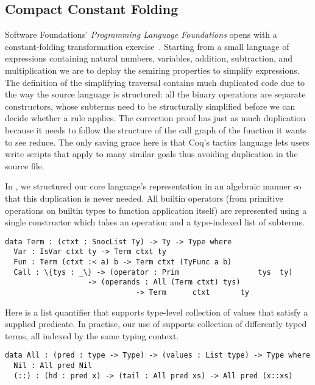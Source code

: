 \subsection{Compact Constant Folding}
\label{sec:design:constants}

Software Foundations' \emph{Programming Language Foundations} opens with a constant-folding transformation exercise~\cite[Chapter~1]{Pierce:SF2}.
%
Starting from a small language of expressions containing natural numbers, variables, addition, subtraction, and multiplication we are to deploy the semiring properties to simplify expressions.
%
The definition of the simplifying traversal contains much duplicated code due to the way the source language is structured:
%
all the binary operations are separate constructors, whose subterms need to be structurally simplified before we can decide whether a rule applies.
%
The correction proof has just as much duplication because it needs to follow the structure of the call graph of the function it wants to see reduce.
%
The only saving grace here is that Coq's tactics language lets users write scripts that apply to many similar goals thus avoiding duplication in the source file.

In \Velo{}, we structured our core language's representation in an algebraic
manner so that this duplication is never needed.
%
All builtin operators (from primitive operations on builtin types to function
application itself) are represented using a single  constructor
which takes an operation and a type-indexed list of subterms.

\begin{Verbatim}
data Term : (ctxt : SnocList Ty) -> Ty -> Type where
  Var : IsVar ctxt ty -> Term ctxt ty
  Fun : Term (ctxt :< a) b -> Term ctxt (TyFunc a b)
  Call : \{tys : _\} -> (operator : Prim                  tys  ty)
                   -> (operands : All (Term ctxt) tys)
                              -> Term      ctxt       ty
\end{Verbatim}


Here  is a list quantifier that supports type-level collection of values that satisfy a supplied predicate.
In practise, our use of  supports collection of differently typed terms, all indexed by the same typing context.

\begin{Verbatim}
data All : (pred : type -> Type) -> (values : List type) -> Type where
  Nil : All pred Nil
  (::) : (hd : pred x) -> (tail : All pred xs) -> All pred (x::xs)
\end{Verbatim}

